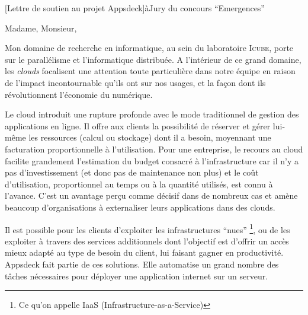 \documentclass[a4paper,10pt]{article}
\begin{document}

\begin{letter}[Lettre de soutien au projet Appsdeck]{à}{Jury du concours ``Emergences''}

Madame, Monsieur,

Mon domaine de recherche en informatique, au sein du laboratoire \textsc{Icube},
porte  sur le  parallélisme et  l'informatique distribuée.  A l'intérieur  de ce
grand domaine,  les \textit{clouds} focalisent une  attention toute particulière
dans  notre équipe  en  raison de  l'impact incontournable  qu'ils  ont sur  nos
usages, et la façon dont ils révolutionnent l'économie du numérique.

Le cloud introduit une rupture profonde avec le mode traditionnel de gestion des
applications en ligne. Il offre aux  clients la possibilité de réserver et gérer
lui-même les  ressources (calcul ou  stockage) dont  il a besoin,  moyennant une
facturation proportionnelle à l'utilisation. Pour  une entreprise, le recours au
cloud facilite grandement l'estimation du budget consacré à l'infrastructure car
il n'y a pas  d'investissement (et donc pas de maintenance non  plus) et le coût
d'utilisation, proportionnel  au temps ou  à la  quantité utilisés, est  connu à
l'avance. C'est  un avantage perçu comme  décisif dans de nombreux  cas et amène
beaucoup d'organisations à externaliser leurs applications dans des clouds.

Il est possible pour les clients d'exploiter les infrastructures ``nues''
\footnote{Ce  qu'on  appelle  IaaS  (Infrastructure-as-a-Service)},  ou  de  les
exploiter à  travers des services  additionnels dont l'objectif est  d'offrir un
accès  mieux  adapté  au  type  de  besoin du  client,  lui  faisant  gagner  en
productivité.  Appsdeck fait  partie de ces solutions. Elle  automatise un grand
nombre  des tâches  nécessaires pour  déployer une  application internet  sur un
serveur. 


\end{letter}
\end{document}
